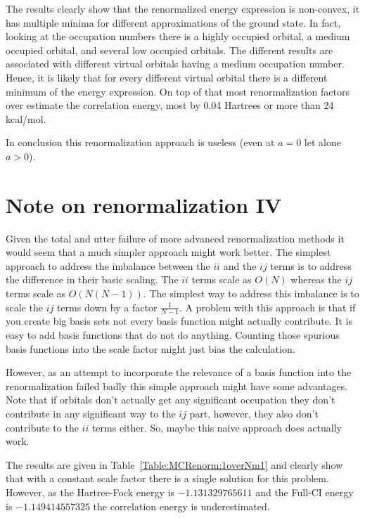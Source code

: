 \documentclass[pra,nofootinbib]{revtex4-1}
\begin{document}
The results clearly show that the renormalized energy expression is non-convex, it has multiple minima for
different approximations of the ground state. In fact, looking at the occupation numbers there is a highly
occupied orbital, a medium occupied orbital, and several low occupied orbitals. The different results are 
associated with different virtual orbitals having a medium occupation number. Hence, it is likely that
for every different virtual orbital there is a different minimum of the energy expression. On top of that
most renormalization factors over estimate the correlation energy, most by 0.04 Hartrees or more
than 24 kcal/mol. 

In conclusion this renormalization approach is useless (even at $a=0$ let alone $a>0$).

\section{Note on renormalization IV}

Given the total and utter failure of more advanced renormalization methods it would seem
that a much simpler approach might work better. The simplest approach to address the imbalance
between the $ii$ and the $ij$ terms is to address the difference in their basic scaling.
The $ii$ terms scale as $O(N)$ whereas the $ij$ terms scale as $O\left(N(N-1)\right)$. 
The simplest way to address this imbalance is to scale the $ij$ terms down by a factor
$\frac{1}{N-1}$. A problem with this approach is that if you create big basis sets not
every basis function might actually contribute. It is easy to add basis functions that 
do not do anything. Counting those spurious basis functions into the scale factor might
just bias the calculation.

However, as an attempt to incorporate the relevance of a basis function into the renormalization
failed badly this simple approach might have some advantages. Note that if orbitals don't 
actually get any significant occupation they don't contribute in any significant way to the
$ij$ part, however, they also don't contribute to the $ii$ terms either. So, maybe this
naive approach does actually work.

The results are given in Table~\ref{Table:MCRenorm:1overNm1} and clearly show that with
a constant scale factor there is a single solution for this problem. However, as the 
Hartree-Fock energy is $-1.131329765611$ and the Full-CI energy is $-1.149414557325$
the correlation energy is underestimated.
\end{document}
